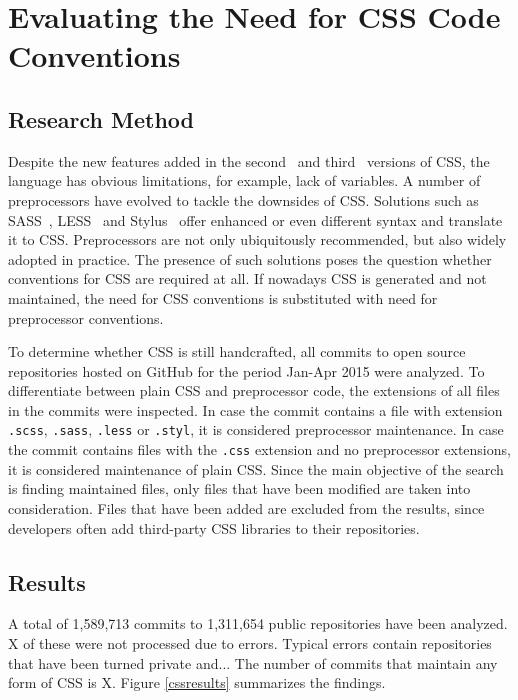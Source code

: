 \documentclass[parskip=full]{uvamscse}
\begin{document}
\chapter{Evaluating the Need for CSS Code Conventions}
\label{sec:evaluating}

\section{Research Method}

Despite the new features added in the second~\cite{CSS2} and third~\cite{CSS3} versions of CSS, the
language has obvious limitations, for example, lack of variables. A number of preprocessors have
evolved to tackle the downsides of CSS. Solutions such as SASS~\cite{SASS}, LESS~\cite{LESS} and
Stylus~\cite{Stylus} offer enhanced or even different syntax and translate it to CSS. Preprocessors
are not only ubiquitously recommended, but also widely adopted in practice. The presence of such
solutions poses the question whether conventions for CSS are required at all. If nowadays CSS is
generated and not maintained, the need for CSS conventions is substituted with need for preprocessor conventions.

To determine whether CSS is still handcrafted, all commits to open source repositories hosted on
GitHub for the period Jan-Apr 2015 were analyzed. To differentiate between plain CSS and
preprocessor code, the extensions of all files in the commits were inspected. In case the commit
contains a file with extension \texttt{.scss}, \texttt{.sass}, \texttt{.less} or \texttt{.styl}, it
is considered preprocessor maintenance. In case the commit contains files with the \texttt{.css}
extension and no preprocessor extensions, it is considered maintenance of plain CSS. Since the main
objective of the search is finding maintained files, only files that have been modified are taken
into consideration. Files that have been added are excluded from the results, since developers often
add third-party CSS libraries to their repositories.


\section{Results}

A total of 1,589,713 commits to 1,311,654 public repositories have been analyzed. X of these were
not processed due to errors. Typical errors contain repositories that have been turned private
and... The number of commits that maintain any form of CSS is X. Figure \ref{cssresults} summarizes
the findings.
\end{document}
